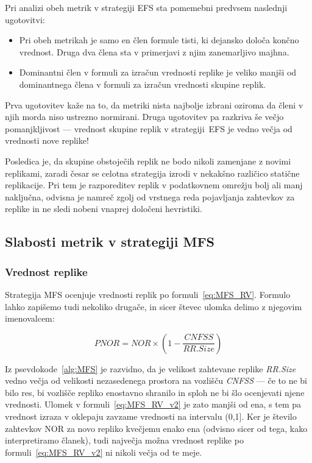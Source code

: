 \documentclass[a4paper, 12pt]{book}
\begin{document}
Pri analizi obeh metrik v strategiji EFS sta pomemebni predvsem naslednji
ugotovitvi:
\begin{itemize}
\item Pri obeh metrikah je samo en člen formule tisti, ki dejansko določa
končno vrednost. Druga dva člena sta v primerjavi z njim zanemarljivo majhna.

\item Dominantni člen v formuli za izračun vrednosti replike je veliko manjši
od dominantnega člena v formuli za izračun vrednosti skupine replik.
\end{itemize}

Prva ugotovitev kaže na to, da metriki nista najbolje izbrani oziroma da
členi v njih morda niso ustrezno normirani. Druga ugotovitev pa razkriva še
večjo pomanjkljivost --- vrednost skupine replik v strategiji~EFS je vedno
večja od vrednosti nove replike!

Posledica je, da skupine obstoječih replik ne bodo nikoli zamenjane z novimi
replikami, zaradi česar se celotna strategija izrodi v nekakšno različico
statične replikacije. Pri tem je razporeditev replik v podatkovnem
omrežju bolj ali manj naključna, odvisna je namreč zgolj od
vrstnega reda pojavljanja zahtevkov za replike in ne sledi nobeni vnaprej
določeni hevristiki.


\subsection{Slabosti metrik v strategiji MFS}

\subsubsection{Vrednost replike}

Strategija MFS ocenjuje vrednosti replik po formuli~\eqref{eq:MFS_RV}.
Formulo lahko zapišemo tudi nekoliko drugače, in sicer števec ulomka delimo z
njegovim imenovalcem:

\begin{equation}
  \mathit{PNOR} = \mathit{NOR} \times
                 \left(1 - \frac{\mathit{CNFSS}}{\mathit{ RR.Size}}\right)
  \label{eq:MFS_RV_v2}
\end{equation}

Iz psevdokode~\ref{alg:MFS} je razvidno, da je velikost zahtevane replike
\textit{RR.Size} vedno večja od velikosti nezasedenega prostora na vozlišču
\textit{CNFSS} --- če to ne bi bilo res, bi vozlišče repliko enostavno shranilo
in sploh ne bi šlo ocenjevati njene vrednosti. Ulomek v
formuli~\eqref{eq:MFS_RV_v2} je zato manjši od ena, s tem pa vrednost izraza v
oklepaju zavzame vrednosti na intervalu (0,1].
Ker je število zahtevkov NOR za novo repliko kvečjemu enako
ena (odvisno sicer od tega, kako interpretiramo članek), tudi največja možna
vrednost replike po formuli~\eqref{eq:MFS_RV_v2} ni nikoli večja od te meje.
\end{document}
